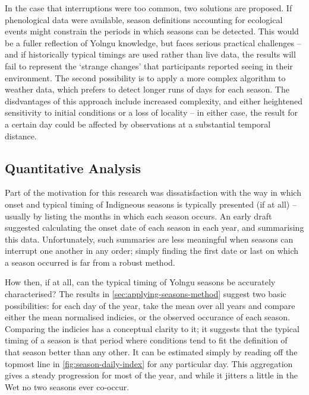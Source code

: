 In the case that interruptions were too common, two solutions are proposed.
If phenological data were available, season definitions accounting for
ecological events might constrain the periods in which seasons can be detected.
This would be a fuller reflection of Yolngu knowledge, but faces serious
practical challenges -- and if historically typical timings are used rather
than live data, the results will fail to represent the `strange changes'
that participants reported seeing in their environment.
%
The second  possibility is to apply a more complex algorithm to weather data,
which prefers to detect longer runs of days for each season.  The disdvantages
of this approach include increased complexity, and either heightened sensitivity
to initial conditions or a loss of locality -- in either case, the result for
a certain day could be affected by observations at a substantial temporal distance.


\subsection{Quantitative Analysis}

Part of the motivation for this research was dissatisfaction with the way in
which onset and typical timing of Indigneous seasons is typically presented
(if at all) -- usually by listing the months in which each season occurs.
%
An early draft suggested calculating the onset date of each season in each
year, and summarising this data.  Unfortunately, such summaries are less
meaningful when seasons can interrupt one another in any order; simply finding
the first date or last on which a season occurred is far from a robust method.

How then, if at all, can the typical timing of Yolngu seasons be accurately
characterised?  The results in \cref{sec:applying-seasons-method} suggest two
basic possibilities: for each day of the year, take the mean over all years
and compare either the mean normalised indicies, or the observed occurance
of each season.
%
Comparing the indicies has a conceptual clarity to it; it suggests that the
typical timing of a season is that period where conditions tend to fit the
definition of that season better than any other.  It can be estimated simply
by reading off the topmost line in \cref{fig:season-daily-index} for any
particular day.  This aggregation gives a steady progression for most of the
year, and while it jitters a little in the Wet no two seasons ever co-occur.

